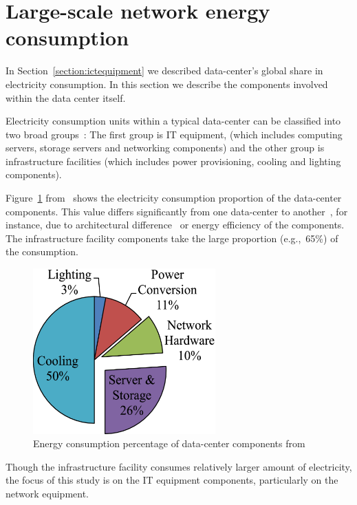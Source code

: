 \section {Large-scale network energy consumption}
\label{section:datacenter} 
In Section~\ref{section:ictequipment} we described data-center's global share in electricity consumption. In this section we describe the components involved within the data center itself.

Electricity consumption units within a typical data-center can be classified into two broad groups~\cite{DBLP:journals/comsur/DayarathnaWF16}: The first group is IT equipment, (which includes computing servers, storage servers and networking components) and the other group is infrastructure facilities (which includes power provisioning, cooling and lighting components).

Figure~\ref{fig:datacenterenergy} from~\cite{DBLP:journals/comsur/DayarathnaWF16} shows the electricity consumption proportion of the data-center components. This value differs significantly from one data-center to another~\cite{DBLP:series/synthesis/2013Barroso}, for instance, due to architectural difference~\cite{DBLP:conf/eenergy/GyarmatiT10} or energy efficiency of the components. The infrastructure facility components take the large proportion (e.g.,~65\%) of the consumption. 
\begin{figure}[ht]
	\begin{center}
		\includegraphics[width=7cm]{images/datacenterenergy.pdf}
		\caption{Energy consumption percentage of data-center components from~\cite{DBLP:journals/comsur/DayarathnaWF16}}
		\label{fig:datacenterenergy}
	\end{center}
\end{figure}

Though the infrastructure facility consumes relatively larger amount of electricity, the focus of this study is on the IT equipment components, particularly on the network equipment. 

